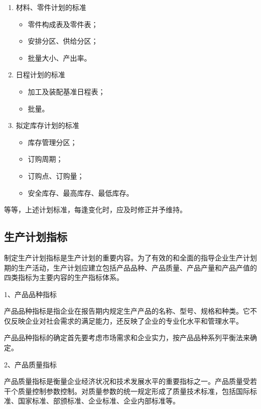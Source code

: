 \begin{enumerate}
             \item  材料、零件计划的标准
                \begin{itemize}
                    \item  零件构成表及零件表；
                    \item  安排分区、供给分区；
                    \item  批量大小、产出率。
                \end{itemize}
            \item  日程计划的标准
                \begin{itemize}
                    \item  加工及装配基准日程表；
                    \item  批量。
                \end{itemize}
            \item  拟定库存计划的标准
                \begin{itemize}
                    \item  库存管理分区；
                    \item  订购周期；
                    \item  订购点、订购量；
                    \item  安全库存、最高库存、最低库存。
                \end{itemize}
        \end{enumerate}

        等等，上述计划标准，每逢变化时，应及时修正并予维持。

\subsection {生产计划指标}

    制定生产计划指标是生产计划的重要内容。为了有效的和全面的指导企业生产计划期的生产活动，生产计划应建立包括产品品种、产品质量、产品产量和产品产值的四类指标为主要内容的生产指标体系。

    1、产品品种指标

        产品品种指标是指企业在报告期内规定生产产品的名称、型号、规格和种类。它不仅反映企业对社会需求的满足能力，还反映了企业的专业化水平和管理水平。

        产品品种指标的确定首先要考虑市场需求和企业实力，按产品品种系列平衡法来确定。

    2、产品质量指标

        产品质量指标是衡量企业经济状况和技术发展水平的重要指标之一。产品质量受若干个质量控制参数控制。对质量参数的统一规定形成了质量技术标准，包括国际标准、国家标准、部颁标准、企业标准、企业内部标准等。

